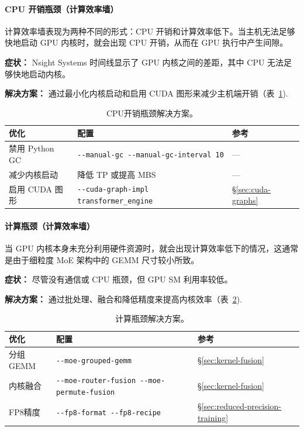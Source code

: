\documentclass[10pt,logo,copyright]{nvidiatechreport_zh}
\begin{document}
\paragraph*{CPU 开销瓶颈（计算效率墙）}
计算效率墙表现为两种不同的形式：CPU 开销和计算效率低下。当主机无法足够快地启动 GPU 内核时，就会出现 CPU 开销，从而在 GPU 执行中产生间隙。

\noindent\textbf{症状：} Nsight Systems 时间线显示了 GPU 内核之间的差距，其中 CPU 无法足够快地启动内核。

\noindent\textbf{解决方案：} 通过最小化内核启动和启用 CUDA 图形来减少主机端开销（表~\ref{tab:cpu-bottleneck}).

\begin{table}[ht]
\centering
\caption{CPU开销瓶颈解决方案。}
\label{tab:cpu-bottleneck}
\begin{tabular}{lll}
\toprule
\textbf{优化} & \textbf{配置} & \textbf{参考} \\
\midrule
禁用 Python GC & \texttt{-{}-manual-gc -{}-manual-gc-interval 10} & --- \\
减少内核启动 & 降低 TP 或提高 MBS & --- \\
启用 CUDA 图形 & \texttt{-{}-cuda-graph-impl transformer\_engine} & \S\ref{sec:cuda-graphs} \\
\bottomrule
\end{tabular}
\end{table}

\paragraph*{计算瓶颈（计算效率墙）}
当 GPU 内核本身未充分利用硬件资源时，就会出现计算效率低下的情况，这通常是由于细粒度 MoE 架构中的 GEMM 尺寸较小所致。

\noindent\textbf{症状：} 尽管没有通信或 CPU 瓶颈，但 GPU SM 利用率较低。

\noindent\textbf{解决方案：} 通过批处理、融合和降低精度来提高内核效率（表~\ref{tab:compute-bottleneck}).

\begin{table}[ht]
\centering
\caption{计算瓶颈解决方案。}
\label{tab:compute-bottleneck}
\begin{tabular}{llp{4cm}}
\toprule
\textbf{优化} & \textbf{配置} & \textbf{参考} \\
\midrule
分组GEMM & \texttt{-{}-moe-grouped-gemm} & \S\ref{sec:kernel-fusion} \\
内核融合 & \texttt{-{}-moe-router-fusion -{}-moe-permute-fusion} & \S\ref{sec:kernel-fusion} \\
FP8精度 & \texttt{-{}-fp8-format -{}-fp8-recipe} & \S\ref{sec:reduced-precision-training} \\
\bottomrule
\end{tabular}
\end{table}
\end{document}
